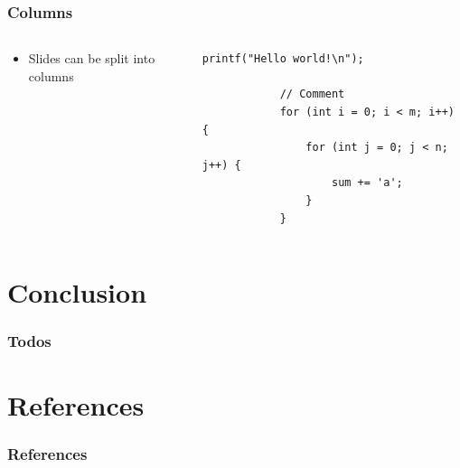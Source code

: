 \documentclass[
	aspectratio=169,
	compress,
]{beamer}
\newcommand{\navframetitle}[1]{\frametitle{#1\hfill{\footnotesize\lastsection{}}}}
\begin{document}
\begin{frame}[fragile]
	\navframetitle{Columns}

	\begin{columns}
		\begin{column}{0.5\textwidth}
			\begin{itemize}
				\item Slides can be split into columns
			\end{itemize}
		\end{column}
		\begin{column}{0.5\textwidth}
			\begin{lstlisting}[gobble=12]
			printf("Hello world!\n");

			// Comment
			for (int i = 0; i < m; i++) {
				for (int j = 0; j < n; j++) {
					sum += 'a';
				}
			}
			\end{lstlisting}
		\end{column}
	\end{columns}
\end{frame}

\section{Conclusion}
\label{sec:conclusion}

\begin{frame}
	\navframetitle{Todos}


	\lipsum[1]
\end{frame}

\appendix

\AtBeginSection[]{}
\AtBeginSubsection[]{}

\section{References}

\begin{frame}[allowframebreaks]
	\frametitle{References}

	
	
\end{frame}
\end{document}

